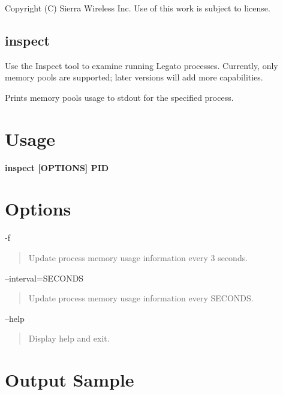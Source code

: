 Copyright (C) Sierra Wireless Inc. Use of this work is subject to license. \hypertarget{toolsTarget_inspect}{}\subsection{inspect}\label{toolsTarget_inspect}
Use the Inspect tool to examine running Legato processes. Currently, only memory pools are supported; later versions will add more capabilities.

Prints memory pools\textquotesingle{} usage to stdout for the specified process.

\section*{Usage}

{\bfseries {\ttfamily inspect \mbox{[}O\+P\+T\+I\+O\+N\+S\mbox{]} P\+I\+D}}

\section*{Options}

\begin{DoxyVerb}-f \end{DoxyVerb}
 \begin{quote}
Update process memory usage information every 3 seconds. \end{quote}


\begin{DoxyVerb}--interval=SECONDS \end{DoxyVerb}
 \begin{quote}
Update process memory usage information every S\+E\+C\+O\+N\+D\+S. \end{quote}


\begin{DoxyVerb}--help \end{DoxyVerb}
 \begin{quote}
Display help and exit. \end{quote}


\section*{Output Sample}

